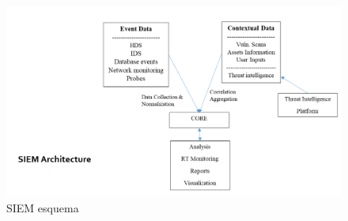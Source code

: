 \begin{enumerate}[resume]
\begin{figure}[htbp]
   \centering
   \includegraphics{images/00/SIEM.png}
   \caption{SIEM esquema}
   \label{fig:00/SIEM}
\end{figure}
\end{enumerate}

